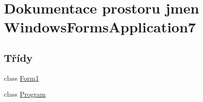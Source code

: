 \hypertarget{namespace_windows_forms_application7}{}\section{Dokumentace prostoru jmen Windows\+Forms\+Application7}
\label{namespace_windows_forms_application7}
\subsection*{Třídy}
\begin{DoxyCompactItemize}
\item 
class \hyperlink{class_windows_forms_application7_1_1_form1}{Form1}
\item 
class \hyperlink{class_windows_forms_application7_1_1_program}{Program}
\end{DoxyCompactItemize}
